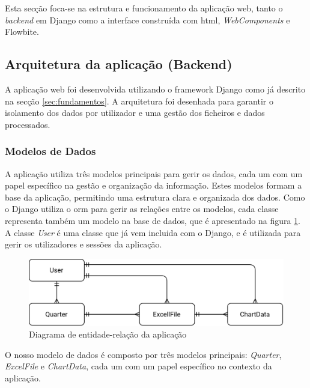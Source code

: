 Esta secção foca-se na estrutura e funcionamento da aplicação web, tanto o \textit{backend} em Django como a interface construída com \gls{html}, \textit{WebComponents} e Flowbite.

\subsection{Arquitetura da aplicação (Backend)}

A aplicação web foi desenvolvida utilizando o framework Django como já descrito na secção \ref{sec:fundamentos}. A arquitetura foi desenhada para garantir o isolamento dos dados por utilizador e uma gestão dos ficheiros e dados processados.

\subsubsection{Modelos de Dados}

A aplicação utiliza três modelos principais para gerir os dados, cada um com um papel específico na gestão e organização da informação. Estes modelos formam a base da aplicação, permitindo uma estrutura clara e organizada dos dados. Como o Django utiliza o \gls{orm} para gerir as relações entre os modelos, cada classe representa também um modelo na base de dados, que é apresentado na figura \ref{fig:er-diagram}. A classe \textit{User} é uma classe que já vem incluida com o Django, e é utilizada para gerir os utilizadores e sessões da aplicação.

\begin{figure}[H]
    \centering
    \includegraphics[width=\textwidth]{./img/er-diagram.png}
 \caption{Diagrama de entidade-relação da aplicação}
 \label{fig:er-diagram}
 \end{figure}


O nosso modelo de dados é composto por três modelos principais: \textit{Quarter}, \textit{ExcelFile} e \textit{ChartData}, cada um com um papel específico no contexto da aplicação.

